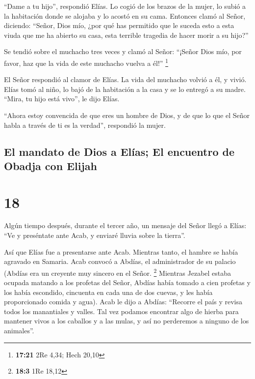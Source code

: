  ``Dame a tu hijo'', respondió Elías. Lo cogió de los
brazos de la mujer, lo subió a la habitación donde se alojaba y lo
acostó en su cama.  Entonces clamó al Señor, diciendo:
``Señor, Dios mío, ¿por qué has permitido que le suceda esto a esta
viuda que me ha abierto su casa, esta terrible tragedia de hacer morir a
su hijo?''

 Se tendió sobre el muchacho tres veces y clamó al Señor:
``¡Señor Dios mío, por favor, haz que la vida de este muchacho vuelva a
él!'' \footnote{\textbf{17:21} 2Re 4,34; Hech 20,10}

 El Señor respondió al clamor de Elías. La vida del
muchacho volvió a él, y vivió.  Elías tomó al niño, lo
bajó de la habitación a la casa y se lo entregó a su madre. ``Mira, tu
hijo está vivo'', le dijo Elías.

 ``Ahora estoy convencida de que eres un hombre de Dios,
y de que lo que el Señor habla a través de ti es la verdad'', respondió
la mujer.

\hypertarget{el-mandato-de-dios-a-eluxedas-el-encuentro-de-obadja-con-elijah}{%
\subsection{El mandato de Dios a Elías; El encuentro de Obadja con
Elijah}\label{el-mandato-de-dios-a-eluxedas-el-encuentro-de-obadja-con-elijah}}

\hypertarget{section-17}{%
\section{18}\label{section-17}}

 Algún tiempo después, durante el tercer año, un mensaje
del Señor llegó a Elías: ``Ve y preséntate ante Acab, y enviaré lluvia
sobre la tierra''.

 Así que Elías fue a presentarse ante Acab. Mientras
tanto, el hambre se había agravado en Samaria.  Acab
convocó a Abdías, el administrador de su palacio (Abdías era un creyente
muy sincero en el Señor. \footnote{\textbf{18:3} 1Re 18,12}
 Mientras Jezabel estaba ocupada matando a los profetas
del Señor, Abdías había tomado a cien profetas y los había escondido,
cincuenta en cada una de dos cuevas, y les había proporcionado comida y
agua).  Acab le dijo a Abdías: ``Recorre el país y revisa
todos los manantiales y valles. Tal vez podamos encontrar algo de hierba
para mantener vivos a los caballos y a las mulas, y así no perderemos a
ninguno de los animales''.

